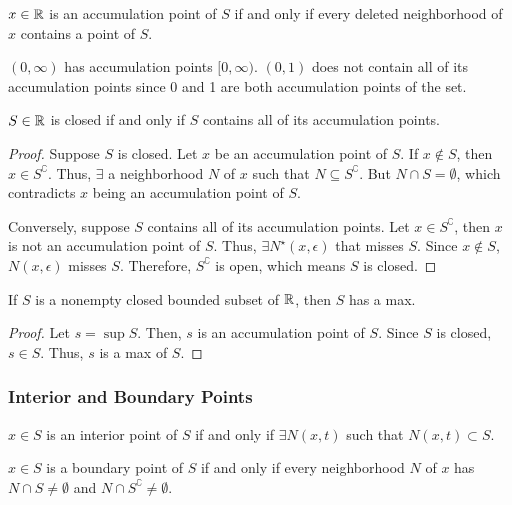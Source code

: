 \begin{definition}
    $x \in \mathbb{R}$ is an accumulation point of $S$ if and only if every deleted neighborhood of $x$ contains a point of $S$.
\end{definition}
\begin{remark}
    $(0, \infty)$ has accumulation points $[0, \infty)$. $(0, 1)$ does not contain all of its accumulation points since 0 and 1 are both accumulation points of the set.
\end{remark}

\begin{theorem}
    $S \in \mathbb{R}$ is closed if and only if $S$ contains all of its accumulation points.
\end{theorem}
\begin{proof}
    Suppose $S$ is closed. Let $x$ be an accumulation point of $S$. If $x \not\in S$, then $x \in S^\complement$. Thus, $\exists$ a neighborhood $N$ of $x$ such that $N \subseteq S^\complement$. But $N \cap S = \emptyset$, which contradicts $x$ being an accumulation point of $S$.

    Conversely, suppose $S$ contains all of its accumulation points. Let $x \in S^\complement$, then $x$ is not an accumulation point of $S$. Thus, $\exists N^\star(x, \epsilon)$ that misses $S$. Since $x \not\in S$, $N(x, \epsilon)$ misses $S$. Therefore, $S^\complement$ is open, which means $S$ is closed.
\end{proof}

\begin{theorem}
    If $S$ is a nonempty closed bounded subset of $\mathbb{R}$, then $S$ has a max.
\end{theorem}
\begin{proof}
    Let $s = \sup S$. Then, $s$ is an accumulation point of $S$. Since $S$ is closed, $s \in S$. Thus, $s$ is a max of $S$.
\end{proof}

\subsubsection{Interior and Boundary Points}
\begin{definition}
    $x \in S$ is an interior point of $S$ if and only if $\exists N(x, t)$ such that $N(x, t) \subset S$.
\end{definition}

\begin{definition}
    $x \in S$ is a boundary point of $S$ if and only if every neighborhood $N$ of $x$ has $N \cap S \neq \emptyset$ and $N \cap S^\complement \neq \emptyset$.
\end{definition}


